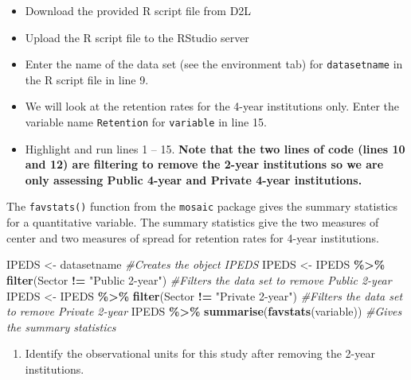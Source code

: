 \documentclass[
]{report}
\newenvironment{Shaded}{\begin{snugshade}}{\end{snugshade}}
\newcommand{\CommentTok}[1]{\textcolor[rgb]{0.56,0.35,0.01}{\textit{#1}}}
\newcommand{\FunctionTok}[1]{\textcolor[rgb]{0.13,0.29,0.53}{\textbf{#1}}}
\newcommand{\NormalTok}[1]{#1}
\newcommand{\OtherTok}[1]{\textcolor[rgb]{0.56,0.35,0.01}{#1}}
\newcommand{\SpecialCharTok}[1]{\textcolor[rgb]{0.81,0.36,0.00}{\textbf{#1}}}
\newcommand{\StringTok}[1]{\textcolor[rgb]{0.31,0.60,0.02}{#1}}
\providecommand{\tightlist}{%
  \setlength{\itemsep}{0pt}\setlength{\parskip}{0pt}}
\begin{document}
\begin{itemize}
\item
  Download the provided R script file from D2L
\item
  Upload the R script file to the RStudio server
\item
  Enter the name of the data set (see the environment tab) for \texttt{datasetname} in the R script file in line 9.
\item
  We will look at the retention rates for the 4-year institutions only. Enter the variable name \texttt{Retention} for \texttt{variable} in line 15.
\item
  Highlight and run lines 1 -- 15. \textbf{Note that the two lines of code (lines 10 and 12) are filtering to remove the 2-year institutions so we are only assessing Public 4-year and Private 4-year institutions.}
\end{itemize}

The \texttt{favstats()} function from the \texttt{mosaic} package gives the summary statistics for a quantitative variable. The summary statistics give the two measures of center and two measures of spread for retention rates for 4-year institutions.

\begin{Shaded}
\begin{Highlighting}[]
\NormalTok{IPEDS }\OtherTok{\textless{}{-}}\NormalTok{ datasetname }\CommentTok{\#Creates the object IPEDS }
\NormalTok{IPEDS }\OtherTok{\textless{}{-}}\NormalTok{ IPEDS }\SpecialCharTok{\%\textgreater{}\%}
  \FunctionTok{filter}\NormalTok{(Sector }\SpecialCharTok{!=} \StringTok{"Public 2{-}year"}\NormalTok{) }\CommentTok{\#Filters the data set to remove Public 2{-}year}
\NormalTok{IPEDS }\OtherTok{\textless{}{-}}\NormalTok{ IPEDS }\SpecialCharTok{\%\textgreater{}\%}
  \FunctionTok{filter}\NormalTok{(Sector }\SpecialCharTok{!=} \StringTok{"Private 2{-}year"}\NormalTok{) }\CommentTok{\#Filters the data set to remove Private 2{-}year}
\NormalTok{IPEDS }\SpecialCharTok{\%\textgreater{}\%}
  \FunctionTok{summarise}\NormalTok{(}\FunctionTok{favstats}\NormalTok{(variable)) }\CommentTok{\#Gives the summary statistics}
\end{Highlighting}
\end{Shaded}

\begin{enumerate}
\def\labelenumi{\arabic{enumi}.}
\setcounter{enumi}{1}
\tightlist
\item
  Identify the observational units for this study after removing the 2-year institutions.
\end{enumerate}
\end{document}
